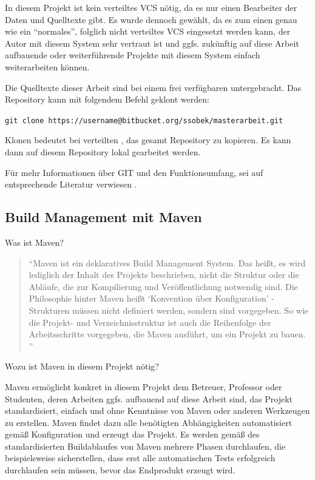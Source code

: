 In diesem Projekt ist kein verteiltes \gls{VCS} nötig, da es nur einen Bearbeiter der Daten und Quelltexte gibt. Es wurde dennoch gewählt, da es zum einen genau wie ein \enquote{normales}, folglich nicht verteiltes \gls{VCS} eingesetzt werden kann, der Autor mit diesem System sehr vertraut ist und ggfs. zukünftig auf diese Arbeit aufbauende oder weiterführende Projekte mit diesem System einfach weiterarbeiten können. 

Die Quelltexte dieser Arbeit sind bei einem frei verfügbaren  untergebracht. Das Repository kann mit folgendem Befehl geklont werden:

\lstinline[basicstyle=\ttfamily\small\mdseries]{git clone https://username@bitbucket.org/ssobek/masterarbeit.git}

Klonen bedeutet bei verteilten , das gesamt Repository zu kopieren. Es kann dann auf diesem Repository lokal gearbeitet werden. 

Für mehr Informationen über GIT und den Funktionsumfang, sei auf entsprechende Literatur verwiesen \citep[vgl.][]{pragGit}. 

\subsection{Build Management mit Maven}

Was ist Maven?

\begin{quotation}
\enquote{Maven ist ein deklaratives Build Management System. Das heißt, es wird lediglich der Inhalt des Projekts beschrieben, nicht die Struktur oder die Abläufe, die zur Kompilierung und Veröffentlichung notwendig sind. Die Philosophie hinter Maven heißt \enquote{Konvention über Konfiguration} - Strukturen müssen nicht definiert werden, sondern sind vorgegeben. So wie die Projekt- und Verzeichnisstruktur ist auch die Reihenfolge der Arbeitsschritte vorgegeben, die Maven ausführt, um ein Projekt zu bauen. \citep[S. 27][]{Mitp-Verlag}}	
\end{quotation}

Wozu ist Maven in diesem Projekt nötig?

Maven ermöglicht konkret in diesem Projekt dem Betreuer, Professor oder Studenten, deren Arbeiten ggfs. aufbauend auf diese Arbeit sind, das Projekt standardisiert, einfach und ohne Kenntnisse von Maven oder anderen Werkzeugen zu erstellen. Maven findet dazu alle benötigten Abhängigkeiten automatisiert gemäß Konfiguration und erzeugt das Projekt. Es werden gemäß des standardisierten Buildablaufes von Maven mehrere Phasen durchlaufen, die beispielsweise sicherstellen, dass erst alle automatischen Tests erfolgreich durchlaufen sein müssen, bevor das Endprodukt erzeugt wird. 

